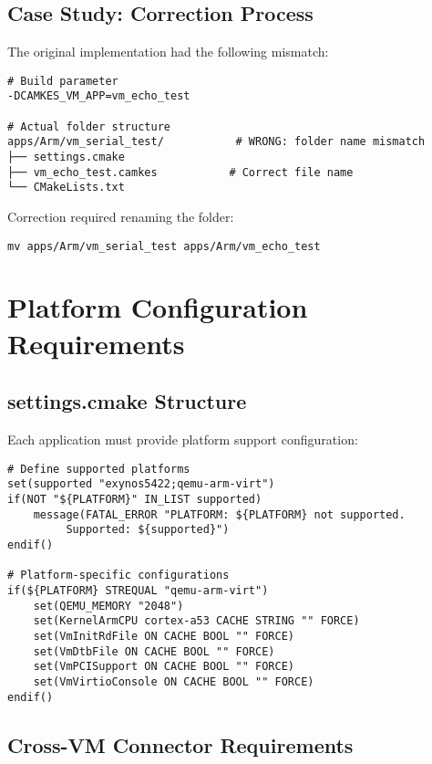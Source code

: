 \documentclass[12pt,a4paper]{article}
\begin{document}
\subsection{Case Study: Correction Process}

The original implementation had the following mismatch:

\begin{lstlisting}[style=bash, caption=Original incorrect structure]
# Build parameter
-DCAMKES_VM_APP=vm_echo_test

# Actual folder structure  
apps/Arm/vm_serial_test/           # WRONG: folder name mismatch
├── settings.cmake
├── vm_echo_test.camkes           # Correct file name
└── CMakeLists.txt
\end{lstlisting}

Correction required renaming the folder:

\begin{lstlisting}[style=bash, caption=Correction command]
mv apps/Arm/vm_serial_test apps/Arm/vm_echo_test
\end{lstlisting}

\section{Platform Configuration Requirements}

\subsection{settings.cmake Structure}

Each application must provide platform support configuration:

\begin{lstlisting}[style=cmake, caption=Platform support structure in settings.cmake]
# Define supported platforms
set(supported "exynos5422;qemu-arm-virt")
if(NOT "${PLATFORM}" IN_LIST supported)
    message(FATAL_ERROR "PLATFORM: ${PLATFORM} not supported.
         Supported: ${supported}")
endif()

# Platform-specific configurations
if(${PLATFORM} STREQUAL "qemu-arm-virt")
    set(QEMU_MEMORY "2048")
    set(KernelArmCPU cortex-a53 CACHE STRING "" FORCE)
    set(VmInitRdFile ON CACHE BOOL "" FORCE)
    set(VmDtbFile ON CACHE BOOL "" FORCE)
    set(VmPCISupport ON CACHE BOOL "" FORCE)
    set(VmVirtioConsole ON CACHE BOOL "" FORCE)
endif()
\end{lstlisting}

\subsection{Cross-VM Connector Requirements}
\end{document}
